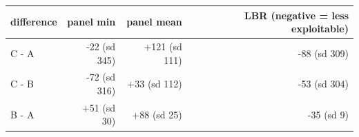 \begin{tabular}{lrrr}
\toprule
difference & panel min & panel mean & LBR (negative = less exploitable) \\
\midrule
C - A & -22 (sd 345) & +121 (sd 111) & -88 (sd 309) \\
C - B & -72 (sd 316) & +33 (sd 112) & -53 (sd 304) \\
B - A & +51 (sd 30) & +88 (sd 25) & -35 (sd 9) \\
\bottomrule
\end{tabular}
